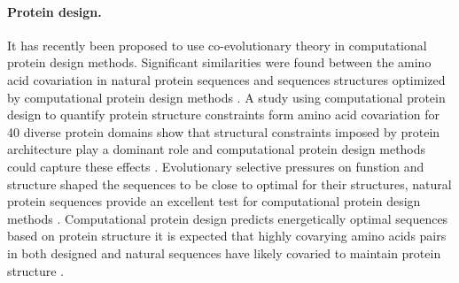 \paragraph{Protein design.} It has recently been proposed to use co-evolutionary theory in computational protein design methods.
Significant similarities were found between the amino acid covariation in natural protein sequences and sequences structures optimized by computational protein design methods \cite{ollikainen2013computational}.
A study \cite{ollikainen2013computational} using computational protein design to quantify protein structure constraints form amino acid covariation for 40 diverse protein domains show that structural constraints imposed by protein architecture play a dominant role and computational protein design methods could capture these effects \cite{ollikainen2013computational}.
Evolutionary selective pressures on funstion and structure shaped the sequences to be close to optimal for their structures, natural protein sequences provide an excellent test for computational protein design methods \cite{ollikainen2013computational}.
Computational protein design predicts energetically optimal sequences based on protein structure it is expected that highly covarying amino acids pairs in both designed and natural sequences have likely covaried to maintain protein structure \cite{ollikainen2013computational}.

